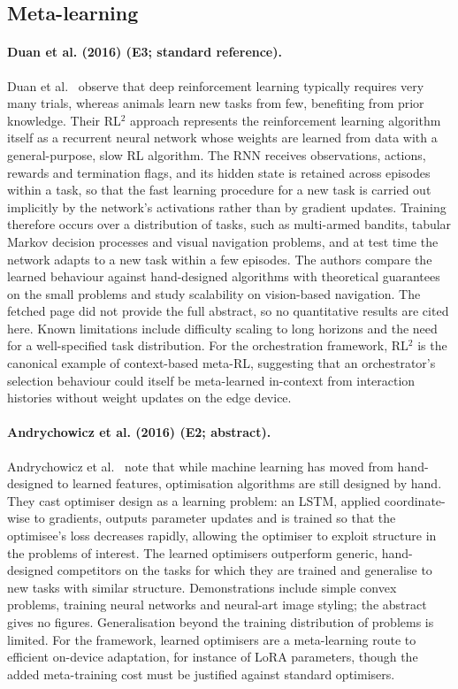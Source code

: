 \documentclass[10pt,a4paper]{article}
\begin{document}
\subsection*{Meta-learning}
\paragraph{Duan et al. (2016) (E3; standard reference).} Duan et al.~\cite{Duan2016} observe that deep reinforcement learning typically requires very many trials, whereas animals learn new tasks from few, benefiting from prior knowledge. Their RL$^2$ approach represents the reinforcement learning algorithm itself as a recurrent neural network whose weights are learned from data with a general-purpose, slow RL algorithm. The RNN receives observations, actions, rewards and termination flags, and its hidden state is retained across episodes within a task, so that the fast learning procedure for a new task is carried out implicitly by the network's activations rather than by gradient updates. Training therefore occurs over a distribution of tasks, such as multi-armed bandits, tabular Markov decision processes and visual navigation problems, and at test time the network adapts to a new task within a few episodes. The authors compare the learned behaviour against hand-designed algorithms with theoretical guarantees on the small problems and study scalability on vision-based navigation. The fetched page did not provide the full abstract, so no quantitative results are cited here. Known limitations include difficulty scaling to long horizons and the need for a well-specified task distribution. For the orchestration framework, RL$^2$ is the canonical example of context-based meta-RL, suggesting that an orchestrator's selection behaviour could itself be meta-learned in-context from interaction histories without weight updates on the edge device.

\paragraph{Andrychowicz et al. (2016) (E2; abstract).} Andrychowicz et al.~\cite{Andrychowicz2016} note that while machine learning has moved from hand-designed to learned features, optimisation algorithms are still designed by hand. They cast optimiser design as a learning problem: an LSTM, applied coordinate-wise to gradients, outputs parameter updates and is trained so that the optimisee's loss decreases rapidly, allowing the optimiser to exploit structure in the problems of interest. The learned optimisers outperform generic, hand-designed competitors on the tasks for which they are trained and generalise to new tasks with similar structure. Demonstrations include simple convex problems, training neural networks and neural-art image styling; the abstract gives no figures. Generalisation beyond the training distribution of problems is limited. For the framework, learned optimisers are a meta-learning route to efficient on-device adaptation, for instance of LoRA parameters, though the added meta-training cost must be justified against standard optimisers.
\end{document}
